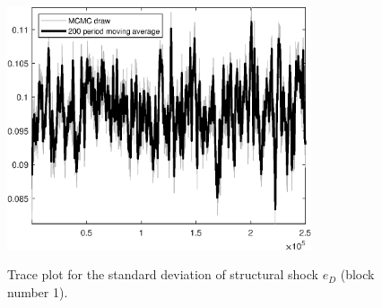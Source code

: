 \begin{figure}[H]
\centering
  \includegraphics[width=0.8\textwidth]{BRS_growth_ext_fd_v1/graphs/TracePlot_SE_e_D_blck_1}\\
    \caption{Trace plot for the standard deviation of structural shock ${e_D}$ (block number 1).}
\end{figure}
